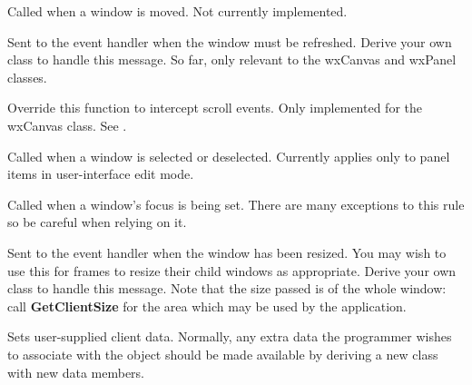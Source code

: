 

Called when a window is moved. Not currently implemented.



Sent to the event handler when the window must be refreshed.
Derive your own class to handle this message. So far, only
relevant to the wxCanvas and wxPanel classes.



Override this function to intercept scroll events. Only implemented
for the wxCanvas class. See .



Called when a window is selected or deselected. Currently applies only to panel items
in user-interface edit mode.



Called when a window's focus is being set. There are many exceptions to this rule
so be careful when relying on it.



Sent to the event handler when the window has been resized. You may wish to use
this for frames to resize their child windows as appropriate. Derive
your own class to handle this message. Note that the size passed is of
the whole window: call {\bf GetClientSize} for the area which may be
used by the application.



Sets user-supplied client data.  Normally, any extra data the programmer wishes
to associate with the object should be made available by deriving a new class
with new data members.


